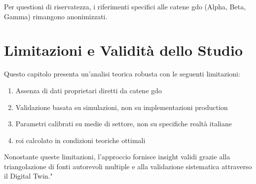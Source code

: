 Per questioni di riservatezza, i riferimenti specifici alle catene 
\gls{gdo} (Alpha, Beta, Gamma) rimangono anonimizzati.

\section{\texorpdfstring{Limitazioni e Validità dello Studio}{2.8 - Limitazioni e Validità dello Studio}}

Questo capitolo presenta un'analisi teorica robusta con le seguenti limitazioni:
\begin{enumerate}
    \item Assenza di dati proprietari diretti da catene \gls{gdo}
    \item Validazione basata su simulazioni, non su implementazioni production
    \item Parametri calibrati su medie di settore, non su specifiche realtà italiane
    \item \gls{roi} calcolato in condizioni teoriche ottimali
\end{enumerate}

Nonostante queste limitazioni, l'approccio fornisce insight validi 
grazie alla triangolazione di fonti autorevoli multiple e alla 
validazione sistematica attraverso il Digital Twin."

\clearpage
\printbibliography[
    heading=subbibliography,
    title={Riferimenti Bibliografici del Capitolo 2},
]

